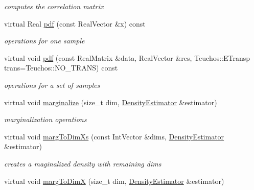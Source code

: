 \begin{DoxyCompactItemize}
\begin{DoxyCompactList}\small\item\em computes the correlation matrix \end{DoxyCompactList}\item 
virtual Real \hyperlink{classPecos_1_1DensityEstimator_ae49fd0166d0cedd899f933e3e2b713aa}{pdf} (const Real\+Vector \&x) const \label{classPecos_1_1DensityEstimator_ae49fd0166d0cedd899f933e3e2b713aa}

\begin{DoxyCompactList}\small\item\em operations for one sample \end{DoxyCompactList}\item 
virtual void \hyperlink{classPecos_1_1DensityEstimator_a83ef7a2b0cf786922fbdfb17d284d2e0}{pdf} (const Real\+Matrix \&data, Real\+Vector \&res, Teuchos\+::\+E\+Transp trans=Teuchos\+::\+N\+O\+\_\+\+T\+R\+A\+NS) const \label{classPecos_1_1DensityEstimator_a83ef7a2b0cf786922fbdfb17d284d2e0}

\begin{DoxyCompactList}\small\item\em operations for a set of samples \end{DoxyCompactList}\item 
virtual void \hyperlink{classPecos_1_1DensityEstimator_a5aa525959e7bee8034a26a77e00f12ef}{marginalize} (size\+\_\+t dim, \hyperlink{classPecos_1_1DensityEstimator}{Density\+Estimator} \&estimator)
\begin{DoxyCompactList}\small\item\em marginalization operations \end{DoxyCompactList}\item 
virtual void \hyperlink{classPecos_1_1DensityEstimator_a50f735eabae41f8948d792ac84749095}{marg\+To\+Dim\+Xs} (const Int\+Vector \&dims, \hyperlink{classPecos_1_1DensityEstimator}{Density\+Estimator} \&estimator)\label{classPecos_1_1DensityEstimator_a50f735eabae41f8948d792ac84749095}

\begin{DoxyCompactList}\small\item\em creates a maginalized density with remaining dims \end{DoxyCompactList}\item 
virtual void \hyperlink{classPecos_1_1DensityEstimator_ab1e735a6e2e62abfaa78e44d3a6bd9ec}{marg\+To\+DimX} (size\+\_\+t dim, \hyperlink{classPecos_1_1DensityEstimator}{Density\+Estimator} \&estimator)\label{classPecos_1_1DensityEstimator_ab1e735a6e2e62abfaa78e44d3a6bd9ec}


\end{DoxyCompactItemize}
